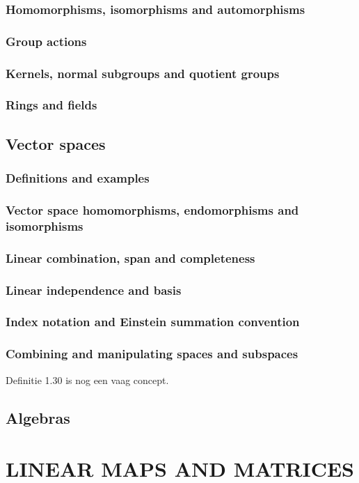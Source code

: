 \documentclass[a4paper,twoside]{article}
\theoremstyle{definition}
\theoremstyle{plain}
\begin{document}
\subsubsection{Homomorphisms, isomorphisms and automorphisms}
\subsubsection{Group actions}
\subsubsection{Kernels, normal subgroups and quotient groups}
\subsubsection{Rings and fields}
\subsection{Vector spaces}
\subsubsection{Definitions and examples}
\subsubsection{Vector space homomorphisms, endomorphisms and isomorphisms}
\subsubsection{Linear combination, span and completeness}
\subsubsection{Linear independence and basis}
\subsubsection{Index notation and Einstein summation convention}
\subsubsection{Combining and manipulating spaces and subspaces}
Definitie 1.30 is nog een vaag concept.
\subsection{Algebras}

\section{LINEAR MAPS AND MATRICES}
\end{document}
